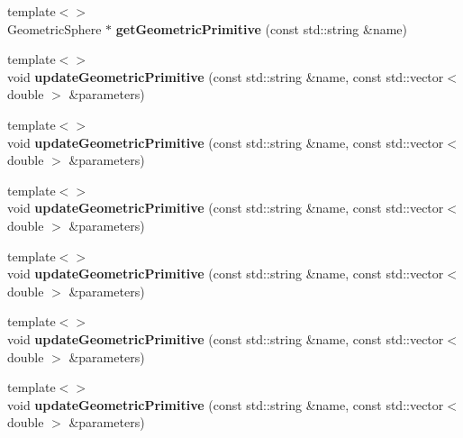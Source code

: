 \begin{DoxyCompactItemize}
\item 
\hypertarget{classhiqp_1_1GeometricPrimitiveMap_aa6f95b06d4b98de2c6f28f26b19565d7}{{\footnotesize template$<$$>$ }\\Geometric\-Sphere $\ast$ {\bfseries get\-Geometric\-Primitive} (const std\-::string \&name)}\label{classhiqp_1_1GeometricPrimitiveMap_aa6f95b06d4b98de2c6f28f26b19565d7}

\item 
\hypertarget{classhiqp_1_1GeometricPrimitiveMap_a8b803eb4c11e33001af1441c52237b1d}{{\footnotesize template$<$$>$ }\\void {\bfseries update\-Geometric\-Primitive} (const std\-::string \&name, const std\-::vector$<$ double $>$ \&parameters)}\label{classhiqp_1_1GeometricPrimitiveMap_a8b803eb4c11e33001af1441c52237b1d}

\item 
\hypertarget{classhiqp_1_1GeometricPrimitiveMap_a8b803eb4c11e33001af1441c52237b1d}{{\footnotesize template$<$$>$ }\\void {\bfseries update\-Geometric\-Primitive} (const std\-::string \&name, const std\-::vector$<$ double $>$ \&parameters)}\label{classhiqp_1_1GeometricPrimitiveMap_a8b803eb4c11e33001af1441c52237b1d}

\item 
\hypertarget{classhiqp_1_1GeometricPrimitiveMap_a8b803eb4c11e33001af1441c52237b1d}{{\footnotesize template$<$$>$ }\\void {\bfseries update\-Geometric\-Primitive} (const std\-::string \&name, const std\-::vector$<$ double $>$ \&parameters)}\label{classhiqp_1_1GeometricPrimitiveMap_a8b803eb4c11e33001af1441c52237b1d}

\item 
\hypertarget{classhiqp_1_1GeometricPrimitiveMap_a8b803eb4c11e33001af1441c52237b1d}{{\footnotesize template$<$$>$ }\\void {\bfseries update\-Geometric\-Primitive} (const std\-::string \&name, const std\-::vector$<$ double $>$ \&parameters)}\label{classhiqp_1_1GeometricPrimitiveMap_a8b803eb4c11e33001af1441c52237b1d}

\item 
\hypertarget{classhiqp_1_1GeometricPrimitiveMap_a8b803eb4c11e33001af1441c52237b1d}{{\footnotesize template$<$$>$ }\\void {\bfseries update\-Geometric\-Primitive} (const std\-::string \&name, const std\-::vector$<$ double $>$ \&parameters)}\label{classhiqp_1_1GeometricPrimitiveMap_a8b803eb4c11e33001af1441c52237b1d}

\item 
\hypertarget{classhiqp_1_1GeometricPrimitiveMap_a8b803eb4c11e33001af1441c52237b1d}{{\footnotesize template$<$$>$ }\\void {\bfseries update\-Geometric\-Primitive} (const std\-::string \&name, const std\-::vector$<$ double $>$ \&parameters)}\label{classhiqp_1_1GeometricPrimitiveMap_a8b803eb4c11e33001af1441c52237b1d}

\end{DoxyCompactItemize}


